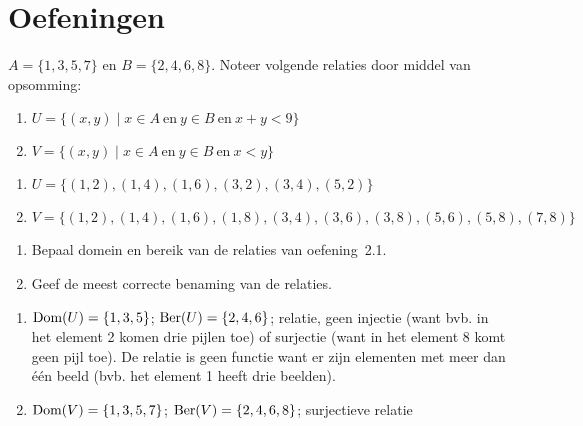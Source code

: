 \section{Oefeningen}
\begin{oef}
\label{oef21}
$A = \{1, 3, 5, 7\}$ en  $B = \{2, 4, 6,8\}$. Noteer volgende relaties door middel van opsomming:
\begin{enumerate}
\item $U=\{(x,y) \mid x\in A \mathrm{~en~} y \in B \mathrm{~en~} x+y<9\}$
\item $V=\{(x,y) \mid x\in A \mathrm{~en~} y \in B  \mathrm{~en~} x<y \}$
\end{enumerate}
\begin{opl}
\begin{enumerate}
\item $U=\{(1,2),(1,4),(1,6),(3,2),(3,4),(5,2) \}$
\item $V=\{(1,2),(1,4),(1,6),(1,8),(3,4),(3,6),(3,8),(5,6),(5,8),(7,8) \}$
\end{enumerate}
\end{opl}
\end{oef}

\begin{oef}
\begin{enumerate}
\item Bepaal domein en bereik van de relaties van oefening~2.1.
\item Geef de meest correcte benaming van de relaties.
\end{enumerate}
\begin{opl}
\begin{enumerate}
\item $\text{Dom}(U)=\{1,3,5 \}$; $\text{Ber}(U)=\{2,4,6 \}$; relatie, geen injectie (want bvb. in het element 2 komen drie pijlen toe) of surjectie (want in het element 8 komt geen pijl toe). De relatie is geen functie want er zijn elementen met meer dan \'e\'en beeld (bvb. het element 1 heeft drie beelden).
\item $\text{Dom}(V)=\{1,3,5,7 \}$; $\text{Ber}(V)=\{2,4,6,8 \}$; surjectieve relatie
\end{enumerate}
\end{opl}
\end{oef}




